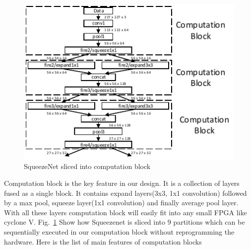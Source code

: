 \documentclass[conference]{IEEEtran}
\begin{document}
\begin{figure}[htbp]
\centerline{\includegraphics[scale=1.2]{squz.pdf}}
\caption{SqueezeNet sliced into computation block}
\label{sqz}
\end{figure}

Computation block is the key feature in our design. It is a collection of layers fused as a single block. It contains expand layers(3x3, 1x1 convolution) followed by a max pool, squeeze layer(1x1 convolution) and finally average pool layer. With all these layers computation block will easily fit into any small FPGA like cyclone V. Fig.~\ref{sqz} Show how Squeezenet is sliced into 9 partitions which can be sequentially executed in our computation block without reprogramming the hardware. Here is the list of main features of computation blocks
\end{document}
